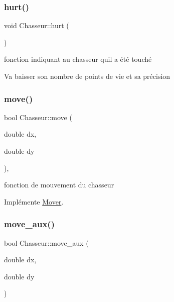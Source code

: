 \mbox{\label{classChasseur_ac75a09254dea5b1d25c7dbf49809a273}} 
\subsubsection{\texorpdfstring{hurt()}{hurt()}}
{\footnotesize\ttfamily void Chasseur\+::hurt (\begin{DoxyParamCaption}{ }\end{DoxyParamCaption})}



fonction indiquant au chasseur qu\textquotesingle{}il a été touché 

Va baisser son nombre de points de vie et sa précision \mbox{\label{classChasseur_ac5275e34388084bc3ca2114b45a0b725}} 
\subsubsection{\texorpdfstring{move()}{move()}}
{\footnotesize\ttfamily bool Chasseur\+::move (\begin{DoxyParamCaption}\item[{double}]{dx,  }\item[{double}]{dy }\end{DoxyParamCaption})\hspace{0.3cm}{\ttfamily [inline]}, {\ttfamily [virtual]}}



fonction de mouvement du chasseur 



Implémente \hyperlink{classMover_a2e1858e5c93ddaa85ff7b446ad403b79}{Mover}.

\mbox{\label{classChasseur_aa6379811f429b4a20c60081493f1ee01}} 
\subsubsection{\texorpdfstring{move\+\_\+aux()}{move\_aux()}}
{\footnotesize\ttfamily bool Chasseur\+::move\+\_\+aux (\begin{DoxyParamCaption}\item[{double}]{dx,  }\item[{double}]{dy }\end{DoxyParamCaption})\hspace{0.3cm}{\ttfamily [private]}}




